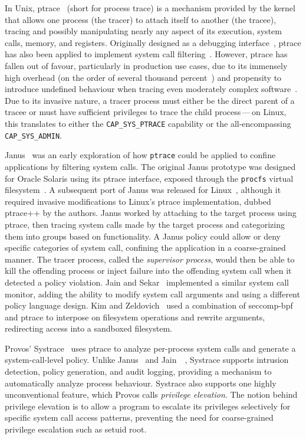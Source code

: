 In Unix, ptrace~\cite{ptrace, padala2002_ptrace} (short for process trace) is a mechanism
provided by the kernel that allows one process (the tracer) to attach itself to another
(the tracee), tracing and possibly manipulating nearly any aspect of its execution, system
calls, memory, and registers. Originally designed as a debugging interface~\cite{ptrace,
padala2002_ptrace}, ptrace has also been applied to implement system call
filtering~\cite{goldberg96_janus, wagner1999_janus, jain2000_filtering, kim2013_mbox}. However, ptrace
has fallen out of favour, particularly in production use cases, due to its immensely high
overhead (on the order of several thousand percent~\cite{zinke2009_overhead}) and
propensity to introduce undefined behaviour when tracing even moderately complex
software~\cite{swiecki2017_promises}. Due to its invasive nature, a tracer process must
either be the direct parent of a tracee or must have sufficient privileges to trace the
child process\,---\,on Linux, this translates to either the \texttt{CAP\_SYS\_PTRACE}
capability or the all-encompassing \texttt{CAP\_SYS\_ADMIN}.

Janus~\cite{goldberg96_janus, wagner1999_janus} was an early exploration of how
\texttt{ptrace} could be applied to confine applications by filtering system calls.  The
original Janus prototype was designed for Oracle Solaris using its ptrace interface,
exposed through the \texttt{procfs} virtual filesystem~\cite{goldberg96_janus}.
A subsequent port of Janus was released for Linux~\cite{wagner1999_janus}, although it
required invasive modifications to Linux's ptrace implementation, dubbed ptrace++ by the
authors. Janus worked by attaching to the target process using ptrace, then tracing system
calls made by the target process and categorizing them into groups based on functionality.
A Janus policy could allow or deny specific categories of system call, confining the
application in a coarse-grained manner. The tracer process, called the \textit{supervisor
process}, would then be able to kill the offending process or inject failure into the
offending system call when it detected a policy violation.  Jain and
Sekar~\cite{jain2000_filtering} implemented a similar system call monitor, adding the
ability to modify system call arguments and using a different policy language design.
Kim and Zeldovich~\cite{kim2013_mbox} used a combination of seccomp-bpf and ptrace
to interpose on filesystem operations and rewrite arguments, redirecting access into
a sandboxed filesystem.

Provos' Systrace~\cite{provos2003_systrace} uses ptrace to analyze per-process system
calls and generate a system-call-level policy. Unlike Janus~\cite{goldberg96_janus,
wagner1999_janus} and Jain~\etal~\cite{jain2000_filtering}, Systrace supports intrusion
detection, policy generation, and audit logging, providing a mechanism to automatically
analyze process behaviour. Systrace also supports one highly unconventional feature, which
Provos calls \textit{privilege elevation}. The notion behind privilege elevation is to
allow a program to escalate its privileges selectively for specific system call access
patterns, preventing the need for coarse-grained privilege escalation such as setuid root.

